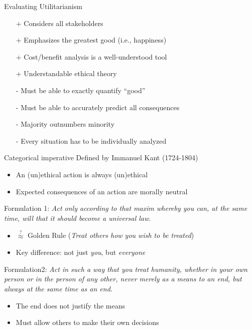 \documentclass{beamer}
\begin{document}
\begin{frame}{Evaluating Utilitarianism}
\begin{itemize}
  \item[+] Considers all stakeholders
  \item[+] Emphasizes the greatest good (i.e., happiness)
  \item[+] Cost/benefit analysis is a well-understood tool
  \item[+] Understandable ethical theory
\pause
  \item[-] Must be able to exactly quantify ``good''
  \item[-] Must be able to accurately predict all consequences
  \item[-] Majority outnumbers minority
  \item[-] Every situation has to be individually analyzed
\end{itemize}
\end{frame}

\begin{frame}{Categorical imperative}
Defined by Immanuel Kant (1724-1804)
\begin{itemize}
\item An (un)ethical action is always (un)ethical
\item Expected consequences of an action are morally neutral
\end{itemize}
\pause
\medskip
Formulation 1: \textit{Act only according to that maxim whereby you can, at the same time, will that it should become a universal law.}
\begin{itemize}
\item $\stackrel{?}{\approx}$ Golden Rule (\textit{Treat others how you wish to be treated})
\item Key difference: not just \emph{you}, but \emph{everyone}
\end{itemize}
\pause
\medskip
Formulation2: \textit{Act in such a way that you treat humanity, whether in your own person or in the person of any other, never
merely as a means to an end, but always at the same time as an end.}
\begin{itemize}
\item The end does not justify the means
\item Must allow others to make their own decisions
\end{itemize}
\end{frame}
\end{document}
